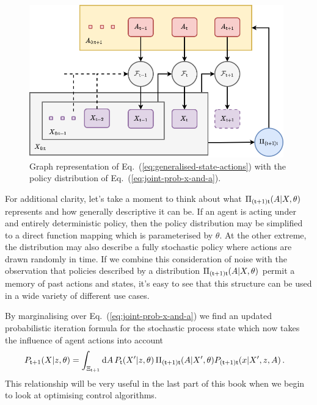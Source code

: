 \begin{figure}[h]
\centering
\includegraphics[width=11cm]{images/chapter-5-fundamental-loop-with-actions.drawio.png}
\caption{Graph representation of Eq.~(\ref{eq:generalised-state-actions}) with the policy distribution of Eq.~(\ref{eq:joint-prob-x-and-a}).}
\label{fig:fundamental-loop-with-actions}
\end{figure}

For additional clarity, let's take a moment to think about what $\Pi_{({\sf t}+1){\sf t}}(A\vert X,\theta)$ represents and how generally descriptive it can be. If an agent is acting under and entirely deterministic policy, then the policy distribution may be simplified to a direct function mapping which is parameterised by $\theta$. At the other extreme, the distribution may also describe a fully stochastic policy where actions are drawn randomly in time. If we combine this consideration of noise with the observation that policies described by a distribution $\Pi_{({\sf t}+1){\sf t}}(A\vert X,\theta)$ permit a memory of past actions and states, it's easy to see that this structure can be used in a wide variety of different use cases.

By marginalising over Eq.~(\ref{eq:joint-prob-x-and-a}) we find an updated probabilistic iteration formula for the stochastic process state which now takes the influence of agent actions into account
\begin{align}
P_{{\sf t}+1}(X\vert z,\theta ) &= \int_{\Xi_{{\sf t}+1}}{\rm d}A \, P_{{\sf t}}(X'\vert z,\theta ) \, \Pi_{({\sf t}+1){\sf t}}(A\vert X',\theta)P_{({\sf t}+1){\sf t}}(x\vert X',z,A)  \,.
\end{align}
This relationship will be very useful in the last part of this book when we begin to look at optimising control algorithms.

